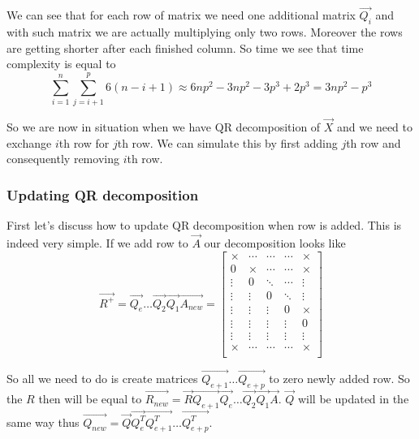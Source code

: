We can see that for each row of matrix we need one additional matrix $\vec{Q_i}$ and with such matrix we are actually multiplying only two rows. Moreover the rows are getting shorter after each finished column. So time we see that time complexity is equal to
\begin{equation}
	\sum\limits_{i=1}^n  \sum\limits_{j=i+1}^p 6(n-i+1) \approx 6np^2 - 3np^2 - 3p^3 + 2p^3 = 3np^2 - p^3
\end{equation}

So we are now in situation when we have QR decomposition of $\vec{X}$ and we need to exchange $i$th row for $j$th row. We can simulate this by first adding $j$th row and consequently removing $i$th row.

\subsubsection*{Updating QR decomposition}
First let's discuss how to update QR decomposition when row is added. This is indeed very simple. 
If we add row to $\vec{A}$ our decomposition looks like
\begin{equation}
	\vec{R^{+}} = \vec{Q_e}\ldots\vec{Q_2}\vec{Q_1}\vec{A_{new}}  = 
	\begin{bmatrix}
		\times & \cdots & \cdots & \cdots & \times \\
		0 &\times & \cdots & \cdots & \times \\
		\vdots& 0&\ddots & \cdots & \vdots \\
		\vdots& \vdots&0 & \ddots &  \vdots \\
		\vdots& \vdots& \vdots& 0& \times \\
		\vdots& \vdots& \vdots& \vdots& 0  \\
		\vdots& \vdots& \vdots& \vdots& \vdots \\
		\times & \cdots & \cdots & \cdots & \times \\
	\end{bmatrix}
\end{equation}

So all we need to do is create matrices $\vec{Q_{e+1}}\ldots\vec{Q_{e+p}}$ to zero newly added row.
So the $R$ then will be equal to $\vec{R_{new}} = \vec{R}\vec{Q_{e+1}}\vec{Q_e}\ldots\vec{Q_2}\vec{Q_1}\vec{A}$. 
$\vec{Q}$ will be updated in the same way thus $\vec{Q_{new}} = \vec{Q}\vec{Q_e^T}\vec{Q_{e+1}^T}\ldots\vec{Q_{e+p}^T}$.

